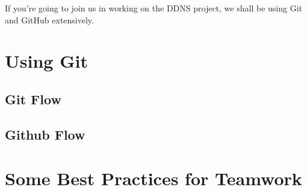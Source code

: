 \documentclass[12pt,a4paper]{article}
\begin{document}
If you're going to join us in working on the DDNS project, we shall be
using Git and GitHub extensively.

\section{Using Git}

\subsection{Git Flow}

\subsection{Github Flow}

\section{Some Best Practices for Teamwork}
\end{document}
